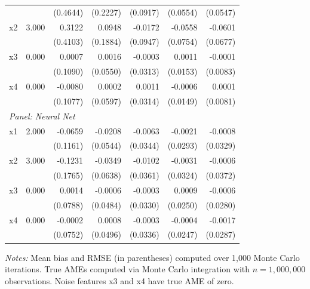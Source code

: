 \begin{table}[htbp]
\begin{threeparttable}
\begin{tabular}{lrrrrrr}
 &  & (0.4644) & (0.2227) & (0.0917) & (0.0554) & (0.0547) \\
\quad x2 & 3.000 & 0.3122 & 0.0948 & -0.0172 & -0.0558 & -0.0601 \\
 &  & (0.4103) & (0.1884) & (0.0947) & (0.0754) & (0.0677) \\
\quad x3 & 0.000 & 0.0007 & 0.0016 & -0.0003 & 0.0011 & -0.0001 \\
 &  & (0.1090) & (0.0550) & (0.0313) & (0.0153) & (0.0083) \\
\quad x4 & 0.000 & -0.0080 & 0.0002 & 0.0011 & -0.0006 & 0.0001 \\
 &  & (0.1077) & (0.0597) & (0.0314) & (0.0149) & (0.0081) \\
\midrule
\multicolumn{7}{l}{\textit{Panel: Neural Net}} \\
\quad x1 & 2.000 & -0.0659 & -0.0208 & -0.0063 & -0.0021 & -0.0008 \\
 &  & (0.1161) & (0.0544) & (0.0344) & (0.0293) & (0.0329) \\
\quad x2 & 3.000 & -0.1231 & -0.0349 & -0.0102 & -0.0031 & -0.0006 \\
 &  & (0.1765) & (0.0638) & (0.0361) & (0.0324) & (0.0372) \\
\quad x3 & 0.000 & 0.0014 & -0.0006 & -0.0003 & 0.0009 & -0.0006 \\
 &  & (0.0788) & (0.0484) & (0.0330) & (0.0250) & (0.0280) \\
\quad x4 & 0.000 & -0.0002 & 0.0008 & -0.0003 & -0.0004 & -0.0017 \\
 &  & (0.0752) & (0.0496) & (0.0336) & (0.0247) & (0.0287) \\
\bottomrule
\end{tabular}
\begin{tablenotes}
\footnotesize
\item \textit{Notes:} Mean bias and RMSE (in parentheses) computed over 1,000 Monte Carlo iterations. True AMEs computed via Monte Carlo integration with $n=1{,}000{,}000$ observations. Noise features x3 and x4 have true AME of zero.
\end{tablenotes}
\end{threeparttable}
\end{table}